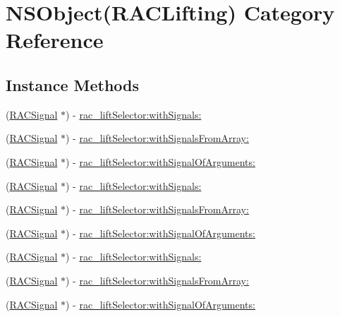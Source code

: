 \hypertarget{category_n_s_object_07_r_a_c_lifting_08}{}\section{N\+S\+Object(R\+A\+C\+Lifting) Category Reference}
\label{category_n_s_object_07_r_a_c_lifting_08}
\subsection*{Instance Methods}
\begin{DoxyCompactItemize}
\item 
(\mbox{\hyperlink{interface_r_a_c_signal}{R\+A\+C\+Signal}} $\ast$) -\/ \mbox{\hyperlink{category_n_s_object_07_r_a_c_lifting_08_a96e6785219ad9772ad33c39dbd7c69a2}{rac\+\_\+lift\+Selector\+:with\+Signals\+:}}
\item 
(\mbox{\hyperlink{interface_r_a_c_signal}{R\+A\+C\+Signal}} $\ast$) -\/ \mbox{\hyperlink{category_n_s_object_07_r_a_c_lifting_08_aaad9d62eb1d7eceaeb8bbf5d2280f636}{rac\+\_\+lift\+Selector\+:with\+Signals\+From\+Array\+:}}
\item 
(\mbox{\hyperlink{interface_r_a_c_signal}{R\+A\+C\+Signal}} $\ast$) -\/ \mbox{\hyperlink{category_n_s_object_07_r_a_c_lifting_08_a7c413bf6dc3325f77c93998b90cec8ab}{rac\+\_\+lift\+Selector\+:with\+Signal\+Of\+Arguments\+:}}
\item 
(\mbox{\hyperlink{interface_r_a_c_signal}{R\+A\+C\+Signal}} $\ast$) -\/ \mbox{\hyperlink{category_n_s_object_07_r_a_c_lifting_08_a96e6785219ad9772ad33c39dbd7c69a2}{rac\+\_\+lift\+Selector\+:with\+Signals\+:}}
\item 
(\mbox{\hyperlink{interface_r_a_c_signal}{R\+A\+C\+Signal}} $\ast$) -\/ \mbox{\hyperlink{category_n_s_object_07_r_a_c_lifting_08_aaad9d62eb1d7eceaeb8bbf5d2280f636}{rac\+\_\+lift\+Selector\+:with\+Signals\+From\+Array\+:}}
\item 
(\mbox{\hyperlink{interface_r_a_c_signal}{R\+A\+C\+Signal}} $\ast$) -\/ \mbox{\hyperlink{category_n_s_object_07_r_a_c_lifting_08_a7c413bf6dc3325f77c93998b90cec8ab}{rac\+\_\+lift\+Selector\+:with\+Signal\+Of\+Arguments\+:}}
\item 
(\mbox{\hyperlink{interface_r_a_c_signal}{R\+A\+C\+Signal}} $\ast$) -\/ \mbox{\hyperlink{category_n_s_object_07_r_a_c_lifting_08_a96e6785219ad9772ad33c39dbd7c69a2}{rac\+\_\+lift\+Selector\+:with\+Signals\+:}}
\item 
(\mbox{\hyperlink{interface_r_a_c_signal}{R\+A\+C\+Signal}} $\ast$) -\/ \mbox{\hyperlink{category_n_s_object_07_r_a_c_lifting_08_aaad9d62eb1d7eceaeb8bbf5d2280f636}{rac\+\_\+lift\+Selector\+:with\+Signals\+From\+Array\+:}}
\item 
(\mbox{\hyperlink{interface_r_a_c_signal}{R\+A\+C\+Signal}} $\ast$) -\/ \mbox{\hyperlink{category_n_s_object_07_r_a_c_lifting_08_a7c413bf6dc3325f77c93998b90cec8ab}{rac\+\_\+lift\+Selector\+:with\+Signal\+Of\+Arguments\+:}}
\end{DoxyCompactItemize}


